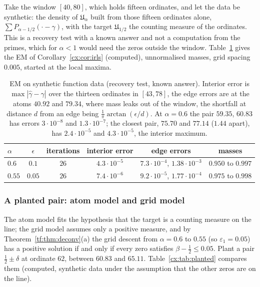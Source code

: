 Take the window $[40,80]$, which holds fifteen ordinates, and let the data be synthetic: the density of $\mathfrak U_\alpha$ built from those fifteen ordinates alone, $\sum P_{\alpha-1/2}(\cdot-\gamma)$, with the target $\mathfrak U_{1/2}$ the counting measure of the ordinates. This is a recovery test with a known answer and not a computation from the primes, which for $\alpha<1$ would need the zeros outside the window. Table~\ref{cx:tab:atoms} gives the EM of Corollary~\ref{cx:cor:irls} (computed), unnormalised masses, grid spacing $0.005$, started at the local maxima.

\begin{table}[h]
\centering\footnotesize
\begin{tabular}{@{}lccccc@{}}
\toprule
$\alpha$ & $\epsilon$ & iterations & interior error & edge errors & masses \\
\midrule
$0.6$ & $0.1$ & $26$ & $4.3\cdot10^{-5}$ & $7.3\cdot10^{-4}$, $1.38\cdot10^{-3}$ & $0.950$ to $0.997$ \\
$0.55$ & $0.05$ & $26$ & $7.4\cdot10^{-6}$ & $9.2\cdot10^{-5}$, $1.77\cdot10^{-4}$ & $0.975$ to $0.998$ \\
\bottomrule
\end{tabular}
\caption{EM on synthetic function data (recovery test, known answer). Interior error is $\max|\hat\gamma-\gamma|$ over the thirteen ordinates in $[43,78]$, the edge errors are at the atoms $40.92$ and $79.34$, where mass leaks out of the window, the shortfall at distance $d$ from an edge being $\tfrac1\pi\arctan(\epsilon/d)$. At $\alpha=0.6$ the pair $59.35$, $60.83$ has errors $3\cdot10^{-8}$ and $1.3\cdot10^{-7}$; the closest pair, $75.70$ and $77.14$ ($1.44$ apart), has $2.4\cdot10^{-5}$ and $4.3\cdot10^{-5}$, the interior maximum.}\label{cx:tab:atoms}
\end{table}


\subsubsection*{A planted pair: atom model and grid model}

The atom model fits the hypothesis that the target is a counting measure on the line; the grid model assumes only a positive measure, and by Theorem~\ref{tf:thm:deconv}(a) the grid descent from $\alpha=0.6$ to $0.55$ (so $\varepsilon_1=0.05$) has a positive solution if and only if every zero satisfies $\beta-\tfrac12\le0.05$. Plant a pair $\tfrac12\pm\delta$ at ordinate $62$, between $60.83$ and $65.11$. Table~\ref{cx:tab:planted} compares them (computed, synthetic data under the assumption that the other zeros are on the line).

